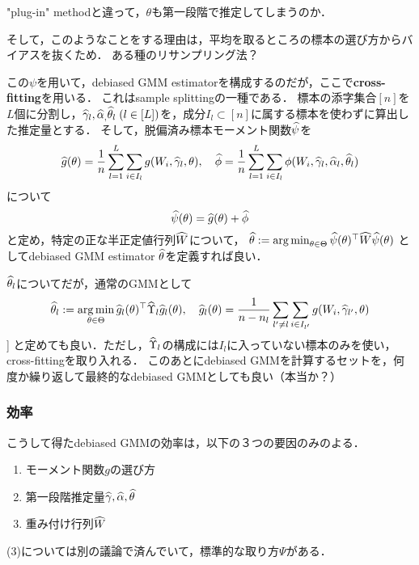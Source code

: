 \documentclass[uplatex,dvipdfmx]{jsreport}
\begin{document}
\begin{tcolorbox}[colframe=ForestGreen, colback=ForestGreen!10!white,breakable,colbacktitle=ForestGreen!40!white,coltitle=black,fonttitle=\bfseries\sffamily,
title=]
    "plug-in" methodと違って，$\theta$も第一段階で推定してしまうのか．

    そして，このようなことをする理由は，平均を取るところの標本の選び方からバイアスを抜くため．
    ある種のリサンプリング法？
\end{tcolorbox}

この$\psi$を用いて，debiased GMM estimatorを構成するのだが，ここで\textbf{cross-fitting}を用いる．
これはsample splittingの一種である．
標本の添字集合$[n]$を$L$個に分割し，$\widehat{\gamma}_l,\widehat{\alpha}_,\widehat{\theta}_l\;(l\in[L])$を，成分$I_l\subset[n]$に属する標本を使わずに算出した推定量とする．
そして，脱偏済み標本モーメント関数$\widehat{\psi}$を
\[\widehat{g}(\theta)=\frac{1}{n}\sum^L_{l=1}\sum_{i\in I_l}g(W_i,\widehat{\gamma}_l,\theta),\quad\widehat{\phi}=\frac{1}{n}\sum^L_{l=1}\sum_{i\in I_l}\phi(W_i,\widehat{\gamma}_l,\widehat{\alpha}_l,\widehat{\theta}_l)\]
について
\[\widehat{\psi}(\theta)=\widehat{g}(\theta)+\widehat{\phi}\]
と定め，特定の正な半正定値行列$\widehat{W}$について，
$\widehat{\theta}:=\operatorname*{arg\,min}_{\theta\in\Theta}\widehat{\psi}(\theta)^\top\widehat{W}\widehat{\psi}(\theta)$
としてdebiased GMM estimator $\widehat{\theta}$を定義すれば良い．

\begin{remark}
    $\widehat{\theta}_l$についてだが，通常のGMMとして
    \[\widehat{\theta}_l:=\operatorname*{arg\,min}_{\theta\in\Theta}\widehat{g}_l(\theta)^\top\widehat{\Upsilon}_l\widehat{g}_l(\theta),\quad\widehat{g}_l(\theta)=\frac{1}{n-n_l}\sum_{l'\ne l}\sum_{i\in I_{l'}}g(W_i,\widehat{\gamma}_{l'},\theta)\]]
    と定めても良い．ただし，$\widehat{\Upsilon}_l$の構成には$I_l$に入っていない標本のみを使い，cross-fittingを取り入れる．
    このあとにdebiased GMMを計算するセットを，何度か繰り返して最終的なdebiased GMMとしても良い（本当か？）
\end{remark}

\subsubsection{効率}

こうして得たdebiased GMMの効率は，以下の３つの要因のみのよる．
\begin{enumerate}
    \item モーメント関数$g$の選び方
    \item 第一段階推定量$\widehat{\gamma},\widehat{\alpha},\widehat{\theta}$
    \item 重み付け行列$\widehat{W}$
\end{enumerate}
(3)については別の議論で済んでいて，標準的な取り方$\Psi$がある．
\end{document}
